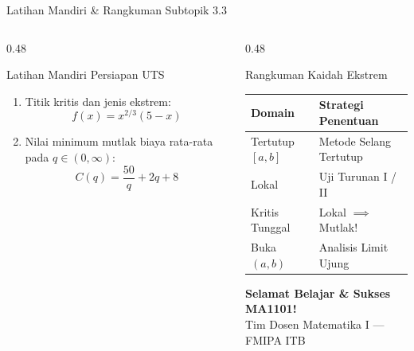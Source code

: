 \documentclass[aspectratio=43,10pt]{beamer}
\begin{document}
\begin{frame}{Latihan Mandiri \& Rangkuman Subtopik 3.3}
    \begin{columns}[T]
        \begin{column}{0.48\textwidth}
            \begin{block}{Latihan Mandiri Persiapan UTS}
                \begin{enumerate}
                    \item Titik kritis dan jenis ekstrem:
                    \[
                        f(x) = x^{2/3}(5 - x)
                    \]
                    \item Nilai minimum mutlak biaya rata-rata pada $q \in (0, \infty)$:
                    \[
                        C(q) = \frac{50}{q} + 2q + 8
                    \]
                \end{enumerate}
            \end{block}
        \end{column}

        \begin{column}{0.48\textwidth}
            \begin{exampleblock}{Rangkuman Kaidah Ekstrem}
                \centering
                \scriptsize
                \setlength{\tabcolsep}{1.5pt}
                \begin{tabular}{|l|l|}
                    \hline
                    \textbf{Domain} & \textbf{Strategi Penentuan} \\
                    \hline
                    Tertutup $[a, b]$ & Metode Selang Tertutup \\
                    Lokal & Uji Turunan I / II \\
                    Kritis Tunggal & Lokal $\implies$ Mutlak! \\
                    Buka $(a, b)$ & Analisis Limit Ujung \\
                    \hline
                \end{tabular}
            \end{exampleblock}

            \vspace{0.12cm}
            \centering
            {\small \textbf{Selamat Belajar \& Sukses MA1101!}}\\
            {\scriptsize \color{SoftGray} Tim Dosen Matematika I --- FMIPA ITB}
        \end{column}
    \end{columns}
\end{frame}
\end{document}
